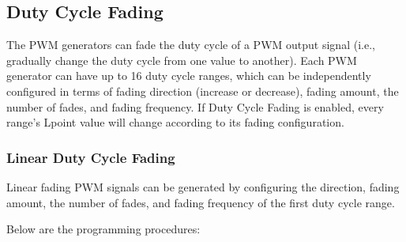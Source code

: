 \documentclass[main\_\_EN.tex]{subfiles}
\begin{document}
\subsection{Duty Cycle Fading}

The PWM generators can fade the duty cycle of a PWM output signal (i.e., gradually change the duty cycle from one value to another). Each PWM generator can have up to 16 duty cycle ranges, which can be independently configured in terms of fading direction (increase or decrease), fading amount, the number of fades, and fading frequency. If Duty Cycle Fading is enabled, every range's Lpoint value will change according to its fading configuration.

\subsubsection{Linear Duty Cycle Fading}
\label{sec:ledc-pwm-linear-duty-cycle-fading}

Linear fading PWM signals can be generated by configuring the  direction, fading amount, the number of fades, and fading frequency of the first duty cycle range.

Below are the programming procedures:
\end{document}
